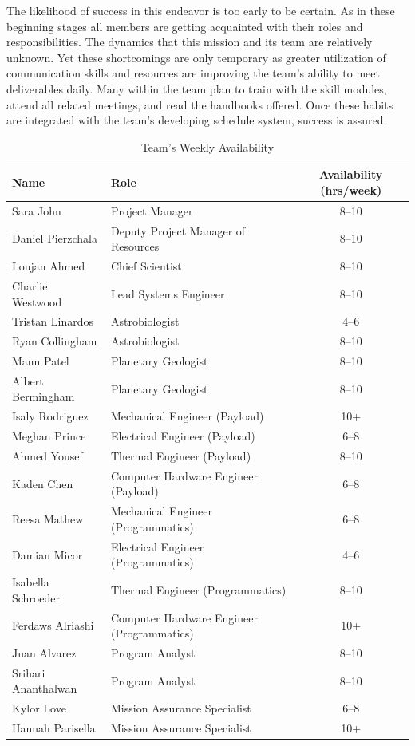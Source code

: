 The likelihood of success in this endeavor is too early to be certain. As in these beginning stages all members are getting acquainted with their roles and responsibilities. The dynamics that this mission and its team are relatively unknown. Yet these shortcomings are only temporary as greater utilization of communication skills and resources are improving the team’s ability to meet deliverables daily. Many within the team plan to train with the skill modules, attend all related meetings, and read the handbooks offered. Once these habits are integrated with the team’s developing schedule system, success is assured.\\

\begin{table}[H]
\centering
\caption{Team’s Weekly Availability}
\label{tab:availability}
\begin{tabular}{|>{\raggedright}p{4cm}|>{\raggedright}p{6cm}|c|}
\hline
\textbf{Name} & \textbf{Role} & \textbf{Availability (hrs/week)} \\
\hline
Sara John & Project Manager & 8--10 \\
Daniel Pierzchala & Deputy Project Manager of Resources & 8--10 \\
Loujan Ahmed & Chief Scientist & 8--10 \\
Charlie Westwood & Lead Systems Engineer & 8--10 \\
Tristan Linardos & Astrobiologist & 4--6 \\
Ryan Collingham & Astrobiologist & 8--10 \\
Mann Patel & Planetary Geologist & 8--10 \\
Albert Bermingham & Planetary Geologist & 8--10 \\
Isaly Rodriguez & Mechanical Engineer (Payload) & 10+ \\
Meghan Prince & Electrical Engineer (Payload) & 6--8 \\
Ahmed Yousef & Thermal Engineer (Payload) & 8--10 \\
Kaden Chen & Computer Hardware Engineer (Payload) & 6--8 \\
Reesa Mathew & Mechanical Engineer (Programmatics) & 6--8 \\
Damian Micor & Electrical Engineer (Programmatics) & 4--6 \\
Isabella Schroeder & Thermal Engineer (Programmatics) & 8--10 \\
Ferdaws Alriashi & Computer Hardware Engineer (Programmatics) & 10+ \\
Juan Alvarez & Program Analyst & 8--10 \\
Srihari Ananthalwan & Program Analyst & 8--10 \\
Kylor Love & Mission Assurance Specialist & 6--8 \\
Hannah Parisella & Mission Assurance Specialist & 10+ \\
\hline
\end{tabular}
\end{table}